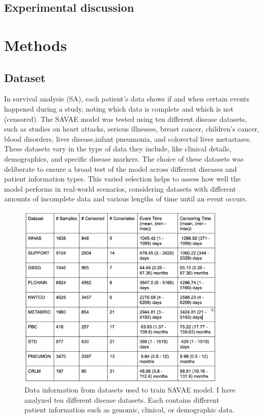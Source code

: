 \documentclass{article}
\begin{document}
\subsection{Experimental discussion}

\section{Methods}
\subsection{Dataset}
In survival analysis (SA), each patient's data shows if and when certain events happened during a study, noting which data is complete and which is not (censored). The SAVAE model was tested using ten different disease datasets, such as studies on heart attacks, serious illnesses, breast cancer, children's cancer, blood disorders, liver disease,infant pneumonia, and colorectal liver metastases. These datasets vary in the type of data they include, like clinical details, demographics, and specific disease markers. The choice of these datasets was deliberate to ensure a broad test of the model across different diseases and patient information types. This varied selection helps to assess how well the model performs in real-world scenarios, considering datasets with different amounts of incomplete data and various lengths of time until an event occurs.

\begin{figure}[H]
    \centering
    \includegraphics[width=10cm]{figures/Dataset.png}
    \caption{Data information from datasets used to train SAVAE model. I have analyzed ten different disease datasets. Each contains different patient information such as genomic, clinical, or demographic data. }
    \label{Dataset}

\end{figure}
\end{document}
